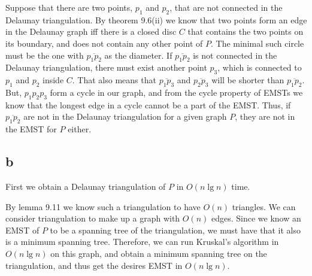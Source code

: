 \documentclass[11pt,a4paper]{article}
\begin{document}
Suppose that there are two points, $p_1$ and $p_2$, that are not
connected in the Delaunay triangulation. By theorem 9.6(ii) we know
that two points form an edge in the Delaunay graph iff there is a
closed disc $C$ that contains the two points on its boundary, and does
not contain any other point of $P$. The minimal such circle must be
the one with $\overline{p_1p_2}$ as the diameter. If
$\overline{p_1p_2}$ is not connected in the Delaunay triangulation,
there must exist another point $p_3$, which is connected to $p_1$ and
$p_2$ inside $C$. That also means that $\overline{p_1p_3}$ and
$\overline{p_2p_3}$ will be shorter than $\overline{p_1p_2}$. But,
$p_1p_2p_3$ form a cycle in our graph, and from the cycle property of
EMSTs we know that the longest edge in a cycle cannot be a part of the
EMST. Thus, if $\overline{p_1p_2}$ are not in the Delaunay
triangulation for a given graph $P$, they are not in the EMST for $P$
either.

\subsection{b}

First we obtain a Delaunay triangulation of $P$ in $O(n \lg n)$ time. 

By lemma 9.11 we know such a triangulation to have $O(n)$ triangles.
We can consider triangulation to make up a graph with $O(n)$ edges.
Since we know an EMST of $P$ to be a spanning tree of the triangulation,
we must have that it also is a minimum spanning tree. 
Therefore, we can run Kruskal's algorithm in $O(n \lg n)$ on this graph,
and obtain a minimum spanning tree on the triangulation, and thus get
the desires EMST in $O(n \lg n)$.
\end{document}
